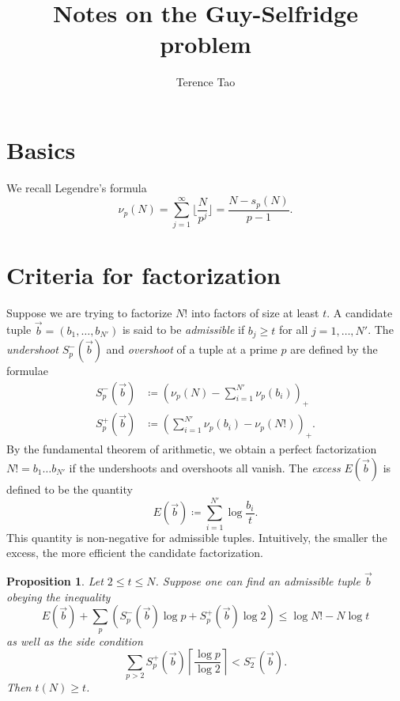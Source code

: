\documentclass[12pt,a4paper,reqno]{amsart}
\numberwithin{equation}{section}
\theoremstyle{plain}
\newtheorem{proposition}[theorem]{Proposition}
\theoremstyle{definition}
\begin{document}
\title{Notes on the Guy-Selfridge problem}

\author{Terence Tao}
\maketitle


\section{Basics}

We recall Legendre's formula
\begin{equation}\label{legendre}
  \nu_p(N) = \sum_{j=1}^\infty \lfloor \frac{N}{p^j} \rfloor = \frac{N - s_p(N)}{p-1}.
\end{equation}

\section{Criteria for factorization}

Suppose we are trying to factorize $N!$ into factors of size at least $t$.  A candidate tuple $\vec b = (b_1,\dots,b_{N'})$ is said to be \emph{admissible} if $b_j \geq t$ for all $j=1,\dots,N'$.  The \emph{undershoot} $S^-_p(\vec b)$ and \emph{overshoot} of a tuple at a prime $p$ are defined by the formulae
\begin{align*}
   S^-_p(\vec b) &\coloneqq (\nu_p(N) - \sum_{i=1}^{N'} \nu_p(b_i))_+ \\
   S^+_p(\vec b) &\coloneqq (\sum_{i=1}^{N'} \nu_p(b_i) - \nu_p(N!))_+.
\end{align*}
By the fundamental theorem of arithmetic, we obtain a perfect factorization $N! = b_1 \dots b_{N'}$ if the undershoots and overshoots all vanish.  The \emph{excess} $E(\vec b)$ is defined to be the quantity
\begin{equation}\label{excess} 
  E(\vec b) \coloneqq \sum_{i=1}^{N'} \log \frac{b_i}{t}.
\end{equation}
This quantity is non-negative for admissible tuples.  Intuitively, the smaller the excess, the more efficient the candidate factorization.

\begin{proposition}  Let $2 \leq t \leq N$.  Suppose one can find an admissible tuple $\vec b$ obeying the inequality
\begin{equation}\label{main} 
  E(\vec b) + \sum_p (S^-_p(\vec b) \log p + S^+_p(\vec b) \log 2) \leq \log N! - N \log t
\end{equation}
as well as the side condition
\begin{equation}\label{side}
 \sum_{p>2} S^+_p(\vec b) \left\lceil \frac{\log p}{\log 2} \right\rceil < S^-_2(\vec b).
\end{equation}
Then $t(N) \geq t$.
\end{proposition}
\end{document}
